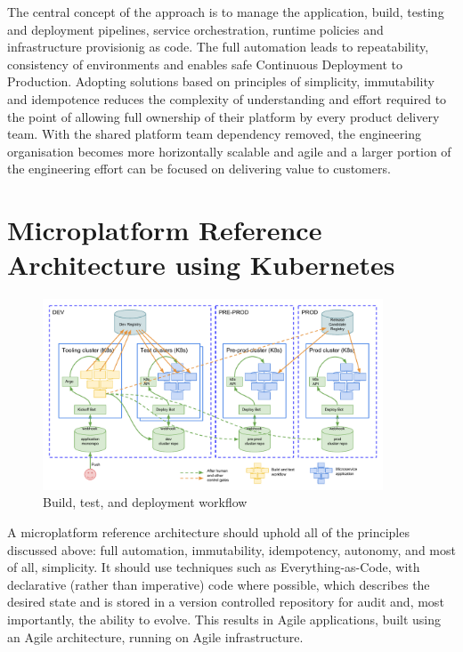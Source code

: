 \documentclass[reprint,amsmath,amssymb,aps]{revtex4-1}
\begin{document}
The central concept of the approach is to manage the application, build, testing and deployment pipelines, service orchestration, runtime policies and infrastructure provisionig as code. The full automation leads to repeatability, consistency of environments and enables safe Continuous Deployment to Production. Adopting solutions based on principles of simplicity, immutability and idempotence reduces the complexity of understanding and effort required to the point of allowing full ownership of their platform by every product delivery team. With the shared platform team dependency removed, the engineering organisation becomes more horizontally scalable and agile and a larger portion of the engineering effort can be focused on delivering value to customers.

\newpage
\clearpage

\appendix
\section{\label{sec:architecture}Microplatform Reference Architecture using Kubernetes}

\begin{figure}[t!]
	\includegraphics[width=0.9\textwidth]{figs/workflow}
	\caption{Build, test, and deployment workflow}
	\label{fig:workflow}
\end{figure}

A microplatform reference architecture should uphold all of the principles discussed above: full automation, immutability, idempotency, autonomy, and most of all, simplicity. It should use techniques such as Everything-as-Code, with declarative (rather than imperative) code where possible, which describes the desired state and is stored in a version controlled repository for audit and, most importantly, the ability to evolve. This results in Agile applications, built using an Agile architecture, running on Agile infrastructure.
\end{document}

